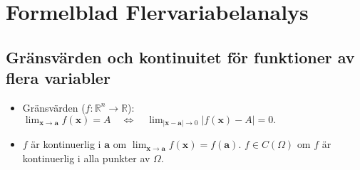 \documentclass{article}
\newcommand\bda{\mathbf a}
\newcommand\bdx{\mathbf x}
\def\Rone{{\mathbb R}}
\begin{document}
\section*{
   {Formelblad Flervariabelanalys}
}

\subsection*{
   {Gränsvärden och kontinuitet för funktioner av flera variabler}
}
\begin{itemize}

\item %
     {Gränsvärden}
($f:\Rone^n\to\Rone$):
 \ $
 \lim_{\bdx\to\bda}f(\bdx)
 = A \quad\iff\quad \lim_{|\bdx-\bda|\to0}|f(\bdx)-A|
 = 0.
 $%

 \item %
   $f$
      {är kontinuerlig i}
   $\bda$
      {om}
   $\lim_{\bdx\to\bda}f(\bdx) = f(\bda)$.
   $f\in C(\Omega)$
      {om}
   $f$
      {är kontinuerlig i alla punkter av}
   $\Omega$.


\end{itemize}
\end{document}
